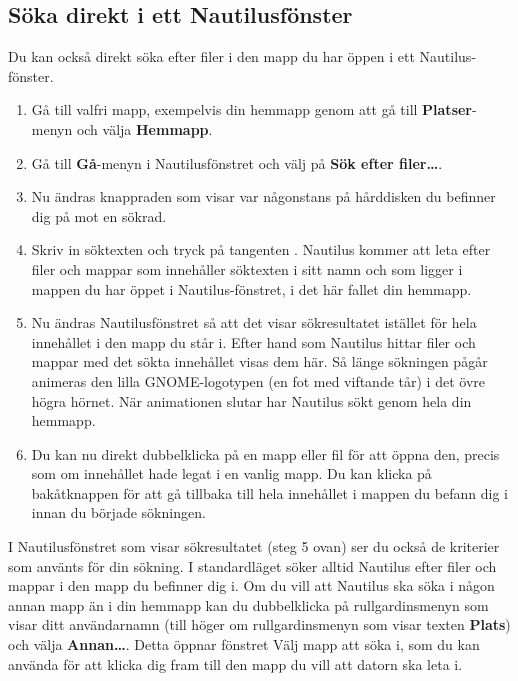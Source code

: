 \documentclass[a4paper,final]{memoir} %
\begin{document}
\subsection{Söka direkt i ett Nautilusfönster}

Du kan också direkt söka efter filer i den mapp du har öppen i ett Nautilus-fönster. 

\begin{enumerate}

\item Gå till valfri mapp, exempelvis din hemmapp genom att gå till \textbf{Platser}-menyn och välja \textbf{Hemmapp}.
\item Gå till \textbf{Gå}-menyn i Nautilusfönstret och välj på \textbf{Sök efter filer\ldots{}}.
\item Nu ändras knappraden som visar var någonstans på hårddisken du befinner dig på mot en sökrad.
\item Skriv in söktexten och tryck på tangenten \xenter{}. Nautilus kommer att leta efter filer och mappar som innehåller söktexten i sitt namn och som ligger i mappen du har öppet i Nautilus-fönstret, i det här fallet din hemmapp.
\item Nu ändras Nautilusfönstret så att det visar sökresultatet istället för hela innehållet i den mapp du står i. Efter hand som Nautilus hittar filer och mappar med det sökta innehållet visas dem här. Så länge sökningen pågår animeras den lilla GNOME-logotypen (en fot med viftande tår) i det övre högra hörnet. När animationen slutar har Nautilus sökt genom hela din hemmapp.
\item Du kan nu direkt dubbelklicka på en mapp eller fil för att öppna den, precis som om innehållet hade legat i en vanlig mapp. Du kan klicka på bakåtknappen för att gå tillbaka till hela innehållet i mappen du befann dig i innan du började sökningen.

\end{enumerate}

\xnegskip{}

I Nautilusfönstret som visar sökresultatet (steg 5 ovan) ser du också de kriterier som använts för din sökning. I standardläget söker alltid Nautilus efter filer och mappar i den mapp du befinner dig i. Om du vill att Nautilus ska söka i någon annan mapp än i din hemmapp kan du dubbelklicka på rullgardinsmenyn som visar ditt användarnamn (till höger om rullgardinsmenyn som visar texten \textbf{Plats}) och välja \textbf{Annan\ldots{}}. Detta öppnar fönstret Välj mapp att söka i, som du kan använda för att klicka dig fram till den mapp du vill att datorn ska leta i.
\end{document}
